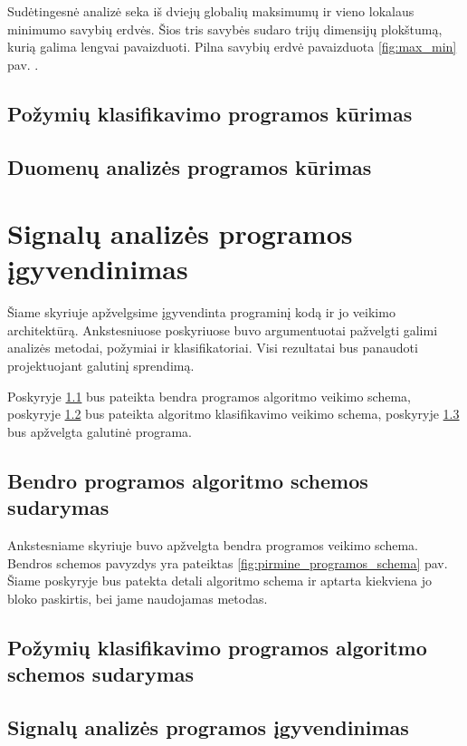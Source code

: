 \documentclass[10pt,onecolumn,draftcls]{IEEEtran}
\begin{document}
Sudėtingesnė analizė seka iš dviejų globalių maksimumų ir vieno
lokalaus minimumo savybių erdvės. Šios tris savybės sudaro trijų
dimensijų plokštumą, kurią galima lengvai pavaizduoti. Pilna savybių
erdvė pavaizduota \ref{fig:max_min} pav. .

\subsection{Požymių klasifikavimo programos kūrimas}

\subsection{Duomenų analizės programos kūrimas}

\section{Signalų analizės programos įgyvendinimas}

Šiame skyriuje apžvelgsime įgyvendinta programinį kodą ir jo veikimo
architektūrą. Ankstesniuose poskyriuose buvo argumentuotai pažvelgti
galimi analizės metodai, požymiai ir klasifikatoriai. Visi rezultatai
bus panaudoti projektuojant galutinį sprendimą.

Poskyryje \ref{subsec:total_scheme} bus pateikta bendra programos
algoritmo veikimo schema, poskyryje \ref{subsec:class_scheme} bus
pateikta algoritmo klasifikavimo veikimo schema, poskyryje
\ref{subsec:total_program} bus apžvelgta galutinė programa.


\subsection{Bendro programos algoritmo schemos sudarymas}
\label{subsec:total_scheme}

Ankstesniame skyriuje buvo apžvelgta bendra programos veikimo
schema. Bendros schemos pavyzdys yra pateiktas
\ref{fig:pirmine_programos_schema} pav. Šiame  poskyryje bus patekta
detali algoritmo schema ir aptarta kiekviena jo bloko paskirtis, bei
jame naudojamas metodas.

\subsection{Požymių klasifikavimo programos algoritmo schemos
  sudarymas}
\label{subsec:class_scheme}

\subsection{Signalų analizės programos įgyvendinimas}
\label{subsec:total_program}
\end{document}
